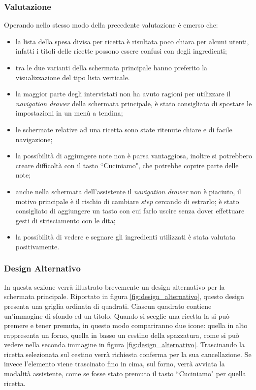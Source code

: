 \clearpage
\subsubsection{Valutazione}

Operando nello stesso modo della precedente valutazione è emerso che:
\begin{itemize}
  \item la lista della spesa divisa per ricetta è risultata poco chiara per alcuni utenti, infatti i titoli delle ricette possono essere confusi con degli ingredienti;
  \item tra le due varianti della schermata principale hanno preferito la visualizzazione del tipo lista verticale.
  \item la maggior parte degli intervistati non ha avuto ragioni per utilizzare il \textit{navigation drawer} della schermata principale, è stato consigliato di spostare le impostazioni in un menù a tendina;
  \item le schermate relative ad una ricetta sono state ritenute chiare e di facile navigazione;
  \item la possibilità di aggiungere note non è parsa vantaggiosa, inoltre si potrebbero creare difficoltà con il tasto ``Cuciniamo", che potrebbe coprire parte delle note;
  \item anche nella schermata dell'assistente il \textit{navigation drawer} non è piaciuto, il motivo principale è il rischio di cambiare \textit{step} cercando di estrarlo; è stato consigliato di aggiungere un tasto con cui farlo uscire senza dover effettuare gesti di strisciamento con le dita;
  \item la possibilità di vedere e segnare gli ingredienti utilizzati è stata valutata positivamente.
\end{itemize}



\clearpage
\subsubsection{Design Alternativo}
In questa sezione verrà illustrato brevemente un design alternativo per la schermata principale.
Riportato in figura \ref{fig:design_alternativo}, questo design presenta una griglia ordinata di quadrati.
Ciascun quadrato contiene un'immagine di sfondo ed un titolo.
Quando si sceglie una ricetta la si può premere e tener premuta, in questo modo compariranno due icone: quella in alto rappresenta un forno, quella in basso un cestino della spazzatura, come si può vedere nella seconda immagine in figura \ref{fig:design_alternativo}.
Trascinando la ricetta selezionata sul cestino verrà richiesta conferma per la sua cancellazione.
Se invece l'elemento viene trascinato fino in cima, sul forno, verrà avviata la modalità assistente, come se fosse stato premuto il tasto ``Cuciniamo" per quella ricetta.

